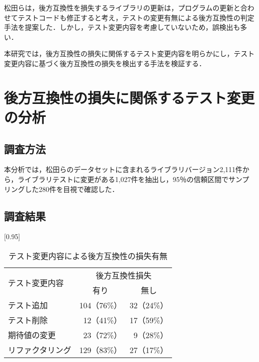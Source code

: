 \documentclass[T,J]{fose} %
\begin{document}
松田らは，後方互換性を損失するライブラリの更新は，プログラムの更新と合わせてテストコードも修正すると考え，テストの変更有無による後方互換性の判定手法を提案した\cite{matsuda}．しかし，テスト変更内容を考慮していないため，誤検出も多い．

本研究では，後方互換性の損失に関係するテスト変更内容を明らかにし，テスト変更内容に基づく後方互換性の損失を検出する手法を検証する．


\section{後方互換性の損失に関係するテスト変更の分析}\label{rq1}

\subsection{調査方法}

本分析では，松田らのデータセットに含まれるライブラリバージョン2,111件から，ライブラリテストに変更がある1,027件を抽出し，95％の信頼区間でサンプリングした280件を目視で確認した．

\subsection{調査結果}

\begin{table}[]
\caption{テスト変更内容による後方互換性の損失有無}
\scalebox{0.95}[0.95]{
\begin{tabular}{l|r|r}
\hline
\multirow{2}{*}{テスト変更内容} & \multicolumn{2}{c}{後方互換性損失}  \\ \cline{2-3}
 & \multicolumn{1}{c|}{有り} & \multicolumn{1}{c}{無し} \\ \hline
テスト追加 & 104（76\%） & 32（24\%） \\ \hline
テスト削除 & 12（41\%） & 17（59\%） \\ \hline
期待値の変更 & 23（72\%） & 9（28\%） \\ \hline
リファクタリング & 129（83\%） & 27（17\%） \\ \hline
\end{tabular}
\label{table_test_pattern}
}
\end{table}
\end{document}
